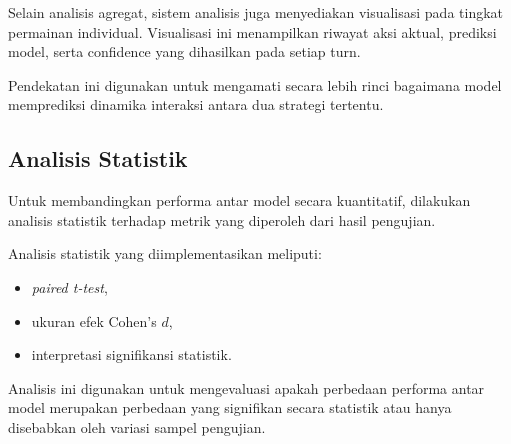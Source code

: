 Selain analisis agregat, sistem analisis juga menyediakan visualisasi pada tingkat permainan individual. Visualisasi ini menampilkan riwayat aksi aktual, prediksi model, serta confidence yang dihasilkan pada setiap turn.

Pendekatan ini digunakan untuk mengamati secara lebih rinci bagaimana model memprediksi dinamika interaksi antara dua strategi tertentu.

\subsection{Analisis Statistik}

Untuk membandingkan performa antar model secara kuantitatif, dilakukan analisis statistik terhadap metrik yang diperoleh dari hasil pengujian.

Analisis statistik yang diimplementasikan meliputi:

\begin{itemize}
\item \textit{paired t-test},
\item ukuran efek Cohen's $d$,
\item interpretasi signifikansi statistik.
\end{itemize}

Analisis ini digunakan untuk mengevaluasi apakah perbedaan performa antar model merupakan perbedaan yang signifikan secara statistik atau hanya disebabkan oleh variasi sampel pengujian.